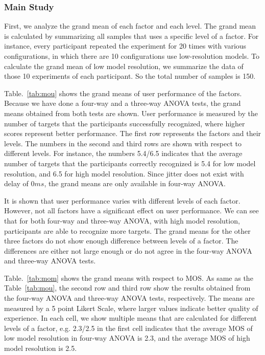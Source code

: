 \subsubsection{Main Study}

First, we analyze the grand mean of each factor and each level.
The grand mean is calculated by summarizing all samples that uses a specific level of a factor.
For instance, every participant repeated the experiment for 20 times with various configurations, in which there are 10 configurations use low-resolution models.
To calculate the grand mean of low model resolution, we summarize the data of those 10 experiments of each participant. So the total number of samples is 150.

Table.~\ref{tab:mou} shows the grand means of user performance of the factors. Because we have done a four-way and a three-way ANOVA tests, the grand means obtained from both tests are shown. User performance is measured by the number of targets that the participants successfully recognized, where higher scores represent better performance. The first row represents the factors and their levels. The numbers in the second and third rows are shown with respect to different levels. For instance, the numbers 5.4/6.5 indicates that the average number of targets that the participants correctly recognized is 5.4 for low model resolution, and 6.5 for high model resolution.
Since jitter does not exist with delay of $0ms$, the grand means are only available in four-way ANOVA.

It is shown that user performance varies with different levels of each factor. However, not all factors have a significant effect on user performance.
We can see that for both four-way and three-way ANOVA, with high model resolution, participants are able to recognize more targets.
The grand means for the other three factors do not show enough difference between levels of a factor. The differences are either not large enough or do not agree in the four-way ANOVA and three-way ANOVA tests.

Table.~\ref{tab:mom} shows the grand means with respect to MOS. As same as the Table~\ref{tab:mou}, the second row and third row show the results obtained from the four-way ANOVA and three-way ANOVA tests, respectively. The means are measured by a 5 point Likert Scale, where larger values indicate better quality of experience. In each cell, we show multiple means that are calculated for different levels of a factor, e.g. 2.3/2.5 in the first cell indicates that the average MOS of low model resolution in four-way ANOVA is 2.3, and the average MOS of high model resolution is 2.5.

